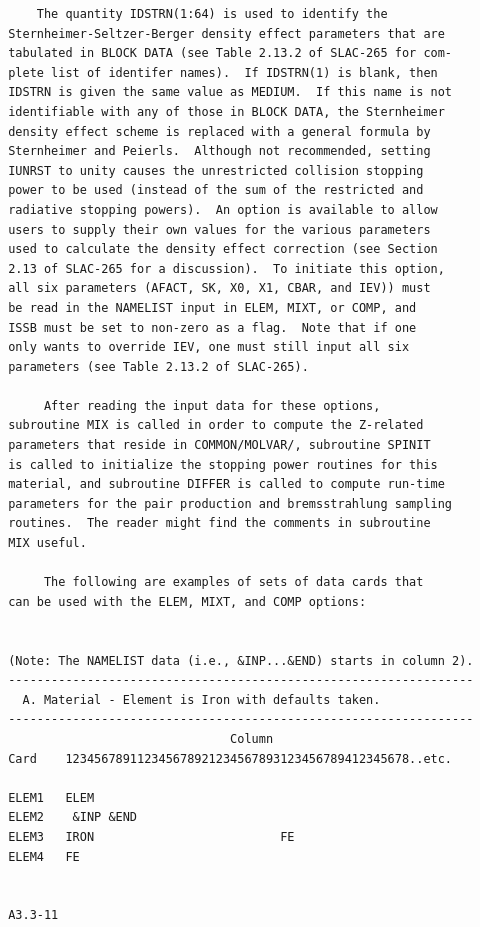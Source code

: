 \newpage \label{issb} 
  \begin{verbatim}
     The quantity IDSTRN(1:64) is used to identify the
 Sternheimer-Seltzer-Berger density effect parameters that are
 tabulated in BLOCK DATA (see Table 2.13.2 of SLAC-265 for com-
 plete list of identifer names).  If IDSTRN(1) is blank, then
 IDSTRN is given the same value as MEDIUM.  If this name is not
 identifiable with any of those in BLOCK DATA, the Sternheimer
 density effect scheme is replaced with a general formula by
 Sternheimer and Peierls.  Although not recommended, setting
 IUNRST to unity causes the unrestricted collision stopping
 power to be used (instead of the sum of the restricted and
 radiative stopping powers).  An option is available to allow
 users to supply their own values for the various parameters
 used to calculate the density effect correction (see Section
 2.13 of SLAC-265 for a discussion).  To initiate this option,
 all six parameters (AFACT, SK, X0, X1, CBAR, and IEV)) must
 be read in the NAMELIST input in ELEM, MIXT, or COMP, and
 ISSB must be set to non-zero as a flag.  Note that if one
 only wants to override IEV, one must still input all six
 parameters (see Table 2.13.2 of SLAC-265).

      After reading the input data for these options,
 subroutine MIX is called in order to compute the Z-related
 parameters that reside in COMMON/MOLVAR/, subroutine SPINIT
 is called to initialize the stopping power routines for this
 material, and subroutine DIFFER is called to compute run-time
 parameters for the pair production and bremsstrahlung sampling
 routines.  The reader might find the comments in subroutine
 MIX useful.

      The following are examples of sets of data cards that
 can be used with the ELEM, MIXT, and COMP options:


 (Note: The NAMELIST data (i.e., &INP...&END) starts in column 2).
 -----------------------------------------------------------------
   A. Material - Element is Iron with defaults taken.
 -----------------------------------------------------------------
                                Column
 Card    123456789112345678921234567893123456789412345678..etc.

 ELEM1   ELEM
 ELEM2    &INP &END
 ELEM3   IRON                          FE
 ELEM4   FE


 A3.3-11
\end{verbatim}
